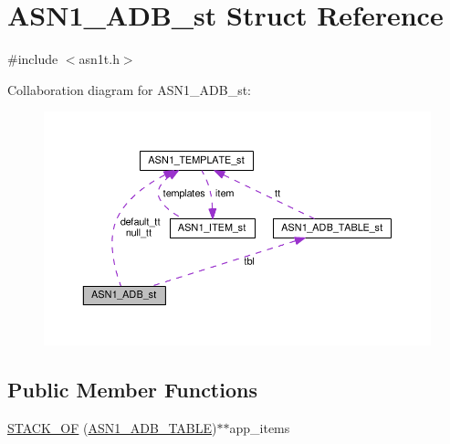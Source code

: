 \hypertarget{struct_a_s_n1___a_d_b__st}{}\section{A\+S\+N1\+\_\+\+A\+D\+B\+\_\+st Struct Reference}
\label{struct_a_s_n1___a_d_b__st}


{\ttfamily \#include $<$asn1t.\+h$>$}



Collaboration diagram for A\+S\+N1\+\_\+\+A\+D\+B\+\_\+st\+:
\nopagebreak
\begin{figure}[H]
\begin{center}
\leavevmode
\includegraphics[width=350pt]{struct_a_s_n1___a_d_b__st__coll__graph}
\end{center}
\end{figure}
\subsection*{Public Member Functions}
\begin{DoxyCompactItemize}
\item 
\hyperlink{struct_a_s_n1___a_d_b__st_ac4ab6147f0b999107f8963dda8009ca7}{S\+T\+A\+C\+K\+\_\+\+OF} (\hyperlink{asn1t_8h_a5fb2bc0218a977f3b0de4df83e654f94}{A\+S\+N1\+\_\+\+A\+D\+B\+\_\+\+T\+A\+B\+LE})$\ast$$\ast$app\+\_\+items
\end{DoxyCompactItemize}
